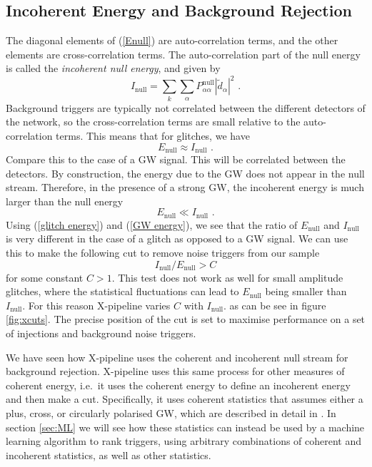 \documentclass[11pt]{cuthesis}
\newcommand{\fs}{\text{ .}}
\newcommand{\xp}{X-pipeline }
\begin{document}
\subsection{Incoherent Energy and Background Rejection} \label{sec:xcuts}
The diagonal elements of (\ref{Enull}) are auto-correlation terms, and the other elements are cross-correlation terms. The auto-correlation part of the null energy is called the \textit{incoherent null energy}, and given by
\begin{equation}
I_\text{null} = \sum_k \sum_\alpha P^\text{null}_{\alpha \alpha} | \tilde{d}_\alpha |^2 \fs
\end{equation}
Background triggers are typically not correlated between the different detectors of the network, so the cross-correlation terms are small relative to the auto-correlation terms. This means that for glitches, we have
\begin{equation} \label{glitch energy}
E_\text{null} \approx I_\text{null} \fs
\end{equation} 
Compare this to the case of a GW signal. This will be correlated between the detectors. By construction, the energy due to the GW does not appear in the null stream. Therefore, in the presence of a strong GW, the incoherent energy is much larger than the null energy 
\begin{equation} \label{GW energy}
E_\text{null} \ll I_\text{null} \fs
\end{equation}
Using (\ref{glitch energy}) and (\ref{GW energy}), we see that the ratio of $E_\text{null}$ and $I_\text{null}$ is very different in the case of a glitch as opposed to a GW signal. We can use this to make the following cut to remove noise triggers from our sample
\begin{equation} \label{cut}
I_\text{null} / E_\text{null} > C
\end{equation}
for some constant $C>1$. This test does not work as well for small amplitude glitches, where the statistical fluctuations can lead to $E_\text{null}$ being smaller than $I_\text{null}$. For this reason \xp varies $C$ with $I_\text{null}$. as can be see in figure \ref{fig:xcuts}. The precise position of the cut is set to maximise performance on a set of injections and background noise triggers.

We have seen how \xp uses the coherent and incoherent null stream for background rejection. \xp uses this same process for other measures of coherent energy, i.e.~it uses the coherent energy to define an incoherent energy and then make a cut. Specifically, it uses coherent statistics that assumes either a plus, cross, or circularly polarised GW, which are described in detail in \cite{chat_xpipeline,xpipeline,was_xpipeline}. In section \ref{sec:ML} we will see how these statistics can instead be used by a machine learning algorithm to rank triggers, using arbitrary combinations of coherent and incoherent statistics, as well as other statistics. 
\end{document}
